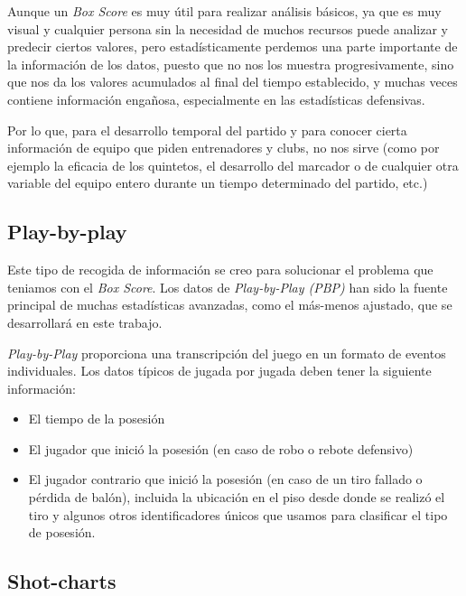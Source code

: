 \documentclass[paper=a4, fontsize=9pt]{article}
\begin{document}
Aunque un \emph{Box Score} es muy útil para realizar análisis básicos, ya que es muy visual y cualquier persona sin la necesidad de muchos recursos puede analizar y predecir ciertos valores, pero estadísticamente perdemos una parte importante de la información de los datos, puesto que no nos los muestra progresivamente, sino que nos da los valores acumulados al final del tiempo establecido, y muchas veces contiene información engañosa, especialmente en las estadísticas defensivas.

Por lo que, para el desarrollo temporal del partido y para conocer cierta información de equipo que piden entrenadores y clubs, no nos sirve (como por ejemplo la eficacia de los quintetos, el desarrollo del marcador o de cualquier otra variable del equipo entero durante un tiempo determinado del partido, etc.)


\subsection{Play-by-play}

Este tipo de recogida de información se creo para solucionar el problema que teniamos con el \emph{Box Score}. Los datos de \emph{Play-by-Play (PBP)} han sido la fuente principal de muchas estadísticas avanzadas, como el más-menos ajustado, que se desarrollará en este trabajo.

\emph{Play-by-Play} proporciona una transcripción del juego en un formato de eventos individuales. Los datos típicos de jugada por jugada deben tener la siguiente información:

\begin{itemize}
  \item El tiempo de la posesión
  \item El jugador que inició la posesión (en caso de robo o rebote defensivo)
  \item El jugador contrario que inició la posesión (en caso de un tiro fallado o pérdida de balón), incluida la ubicación en el piso desde donde se realizó el tiro y algunos otros identificadores únicos que usamos para clasificar el tipo de posesión.
\end{itemize}


\subsection{Shot-charts}
\end{document}
